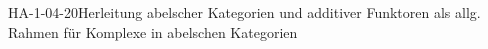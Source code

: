 
\begin{STUD}{HA-1-04-20}{Herleitung abelscher Kategorien und additiver Funktoren als allg. Rahmen für Komplexe in abelschen Kategorien}
\end{STUD}
